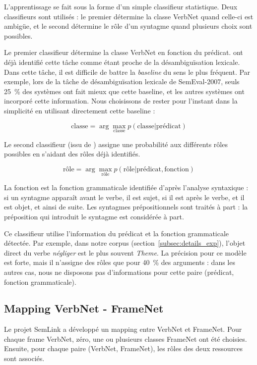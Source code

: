 L'apprentissage se fait sous la forme d'un simple classifieur statistique. Deux
classifieurs sont utilisés : le premier détermine la classe VerbNet quand
celle-ci est ambigüe, et le second détermine le rôle d'un syntagme quand
plusieurs choix sont possibles.

Le premier classifieur détermine la classe VerbNet en fonction du prédicat.
\citet{abend2008supervised} ont déjà identifié cette tâche comme étant proche
de la désambiguïsation lexicale. Dans cette tâche, il est difficile de battre
la \emph{baseline} du sens le plus fréquent. Par exemple, lors de la tâche de
désambiguïsation lexicale de SemEval-2007, seuls 25~\% des systèmes ont fait
mieux que cette baseline, et les autres systèmes ont incorporé cette
information. Nous choisissons de rester pour l'instant dans la simplicité en
utilisant directement cette baseline :

$$ \text{classe} = \arg\max_{\text{classe}} p(\text{classe} \vert \text{prédicat}) $$

Le second classifieur (issu de \cite{swier2004unsupervised}) assigne une
probabilité aux différents rôles possibles en s'aidant des rôles déjà
identifiés.

$$ \text{rôle} = \arg\max_{\text{rôle}} p(\text{rôle} \vert \text{prédicat}, \text{fonction})$$

La fonction est la fonction grammaticale identifiée d'après l'analyse
syntaxique : si un syntagme apparaît avant le verbe, il est sujet, si il est
après le verbe, et il est objet, et ainsi de suite. Les syntagmes
prépositionnels sont traités à part : la préposition qui introduit le syntagme
est considérée à part.

Ce classifieur utilise l'information du prédicat et la fonction grammaticale
détectée. Par exemple, dans notre corpus (section~\ref{subsec:details_exp}),
l'objet direct du verbe \emph{négliger} est le plus souvent \emph{Theme}. La
précision pour ce modèle est forte, mais il n'assigne des rôles que pour 40~\%
des arguments : dans les autres cas, nous ne disposons pas d'informations pour
cette paire (prédicat, fonction grammaticale).

\subsection{Mapping VerbNet - FrameNet}
\label{subsec:mapping}

Le projet SemLink a développé un mapping entre VerbNet et FrameNet. Pour chaque
frame VerbNet, zéro, une ou plusieurs classes FrameNet ont été choisies.
Ensuite, pour chaque paire (VerbNet, FrameNet), les rôles des deux ressources
sont associés.

